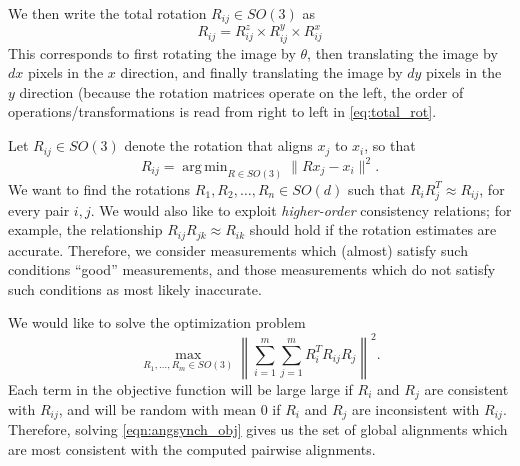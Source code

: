 \documentclass[12pt]{article}
\DeclareMathOperator*{\argmin}{arg\,min}
\begin{document}
%
We then write the total rotation $R_{ij} \in SO(3)$ as 
\begin{equation} \label{eq:total_rot}
	R_{ij}	 = R^z_{ij} \times R^y_{ij} \times R^x_{ij}
\end{equation}
This corresponds to first rotating the image by $\theta$, then translating the image by $dx$ pixels in the $x$ direction, and finally translating the image by $dy$ pixels in the $y$ direction (because the rotation matrices operate on the left, the order of operations/transformations is read from right to left in \eqref{eq:total_rot}.



Let $R_{ij} \in SO(3)$ denote the rotation that aligns $x_j$ to $x_i$, so that
\begin{equation}
R_{ij} = \argmin_{R \in SO(3)} \|Rx_j - x_i \|^2.
\end{equation}
%
We want to find the rotations $R_1, R_2, \dots, R_n \in SO(d)$ such that $R_i R_j^T \approx R_{ij}$, for every pair $i, j$. 
%
We would also like to exploit {\em higher-order} consistency relations;
for example, the relationship $R_{ij} R_{jk} \approx R_{ik}$ should hold if the rotation estimates are accurate.
%
Therefore, we consider measurements which (almost) satisfy such conditions ``good'' measurements, and those measurements which do not satisfy such conditions as most likely inaccurate.

We would like to solve the optimization problem 
\begin{equation} \label{eqn:angsynch_obj}
\max_{R_1, \dots, R_m \in SO(3)} \left\| \sum_{i=1}^{m} \sum_{j=1}^{m} R_i^T R_{ij} R_j \right\|^2.
\end{equation}
%
Each term in the objective function will be large large if $R_i$ and $R_j$ are consistent with $R_{ij}$, and will be random with mean 0 if $R_i$ and $R_j$ are inconsistent with $R_{ij}$.
%
Therefore, solving \eqref{eqn:angsynch_obj} gives us the set of global alignments which are most consistent with the computed pairwise alignments.
\end{document}
